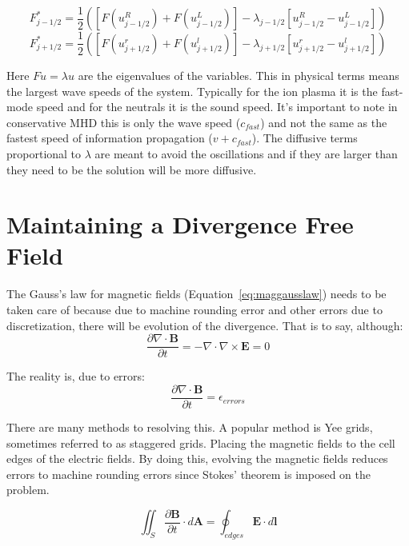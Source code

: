 \documentclass[12pt,upcase]{umlthesis}
\begin{document}
\begin{equation}
	F^*_{j-1/2} = \frac{1}{2} ([F(u^R_{j-1/2})+F(u^L_{j-1/2})] - \lambda_{j-1/2}[u^R_{j-1/2}-u^L_{j-1/2}])
\end{equation}
\begin{equation}
	F^*_{j+1/2} = \frac{1}{2} ([F(u^r_{j+1/2})+F(u^l_{j+1/2})] - \lambda_{j+1/2}[u^r_{j+1/2}-u^l_{j+1/2}])
\end{equation}

Here $F u = \lambda u$ are the eigenvalues of the variables. This in physical terms means the largest wave speeds of the system. Typically for the ion plasma it is the fast-mode speed and for the neutrals it is the sound speed. It's important to note in conservative MHD this is only the wave speed ($c_{fast}$) and not the same as the fastest speed of information propagation ($v+c_{fast}$). The diffusive terms proportional to $\lambda$ are meant to avoid the oscillations and if they are larger than they need to be the solution will be more diffusive.


\section{Maintaining a Divergence Free Field}\label{sec:divergencefree}

The Gauss's law for magnetic fields (Equation~\ref{eq:maggausslaw}) needs to be taken care of because due to machine rounding error and other errors due to discretization, there will be evolution of the divergence. That is to say, although:
\begin{equation}
	\frac{\partial\nabla\cdot\textbf{B}}{\partial t} = -\nabla\cdot\nabla\times\textbf{E} = 0
\end{equation}

The reality is, due to errors:
\begin{equation}
	\frac{\partial\nabla\cdot\textbf{B}}{\partial t} = \epsilon_{errors}
\end{equation}

There are many methods to resolving this. A popular method is Yee grids, sometimes referred to as staggered grids. Placing the magnetic fields to the cell edges of the electric fields. By doing this, evolving the magnetic fields reduces errors to machine rounding errors since Stokes' theorem is imposed on the problem.

\begin{equation}\label{eq:stokesyee}
	\iint_S\frac{\partial\textbf{B}}{\partial t}\cdot d\textbf{A} = {\oint}_{edges} \textbf{E}\cdot d\textbf{l}
\end{equation}
\end{document}
